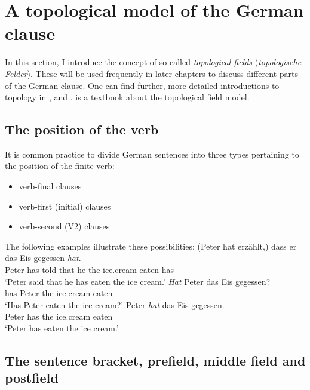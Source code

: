 \section{A topological model of the German clause}
\label{sec-topo}
\label{Abschnitt-Toplogie}

%

In this section, I introduce the concept of so-called \emph{topological fields} (\emph{topologische Felder}). These will be used frequently in later chapters to
discuss different parts of the German clause. One can find further, more detailed introductions to topology in ,
 and .  is a
textbook about the topological field model.




\subsection{The position of the verb}

It is common practice to divide German sentences into three types pertaining to the position of the finite verb:
\begin{itemize}
\item verb-final clauses
\item verb-first (initial) clauses
\item verb-second (V2) clauses
\end{itemize}
%
The following examples illustrate these possibilities:
\eal
\ex 
\gll (Peter hat erzählt,) dass er das Eis gegessen \emph{hat}.\\
     Peter has told that he the ice.cream eaten has\\
\glt `Peter said that he has eaten the ice cream.'
\ex 
\gll \emph{Hat} Peter das Eis gegessen?\\
	 has Peter the ice.cream eaten\\
\glt `Has Peter eaten the ice cream?'
\ex 
\gll Peter \emph{hat} das Eis gegessen.\\
	 Peter has the ice.cream eaten\\
\glt `Peter has eaten the ice cream.'
\zl


\subsection{The sentence bracket, prefield, middle field and postfield}

